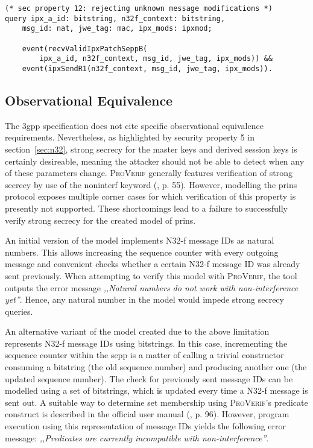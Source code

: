 \begin{lstlisting}[caption={Query for security property 12},label={lst:query-sec-12},firstnumber=221]
(* sec property 12: rejecting unknown message modifications *)
query ipx_a_id: bitstring, n32f_context: bitstring,
    msg_id: nat, jwe_tag: mac, ipx_mods: ipxmod;

    event(recvValidIpxPatchSeppB(
        ipx_a_id, n32f_context, msg_id, jwe_tag, ipx_mods)) &&
    event(ipxSendR1(n32f_context, msg_id, jwe_tag, ipx_mods)).
\end{lstlisting}

\subsection{Observational Equivalence}

The \gls{3gpp} specification does not cite specific observational equivalence requirements.
Nevertheless, as highlighted by security property 5 in section~\ref{sec:n32}, strong secrecy for the master keys and derived session keys is certainly desireable, meaning the attacker should not be able to detect when any of these parameters change.
\textsc{ProVerif} generally features verification of strong secrecy by use of the {\sffamily noninterf} keyword (\cite{blanchet2020proverif}, p. 55).
However, modelling the \gls{prins} protocol exposes multiple corner cases for which verification of this property is presently not supported.
These shortcomings lead to a failure to successfully verify strong secrecy for the created model of \gls{prins}.

An initial version of the model implements N32-f message IDs as natural numbers.
This allows increasing the sequence counter with every outgoing message and convenient checks whether a certain N32-f message ID was already sent previously.
When attempting to verify this model with \textsc{ProVerif}, the tool outputs the error message \textit{,,Natural numbers do not work with non-interference yet''}.
Hence, any natural number in the model would impede strong secrecy queries.

An alternative variant of the model created due to the above limitation represents N32-f message IDs using bitstrings.
In this case, incrementing the sequence counter within the \gls{sepp} is a matter of calling a trivial constructor consuming a bitstring (the old sequence number) and producing another one (the updated sequence number).
The check for previously sent message IDs can be modelled using a set of bitstrings, which is updated every time a N32-f message is sent out.
A suitable way to determine set membership using \textsc{ProVerif}'s {\sffamily predicate} construct is described in the official user manual (\cite{blanchet2020proverif}, p. 96).
However, program execution using this representation of message IDs yields the following error message: \textit{,,Predicates are currently incompatible with non-interference''}.

